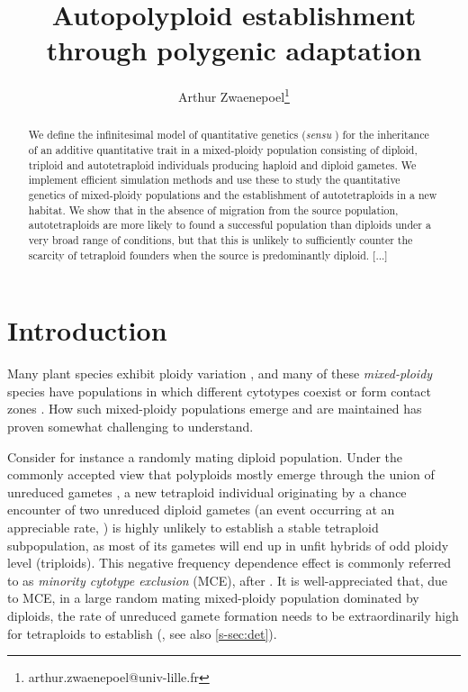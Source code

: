 \documentclass[11pt,a4paper]{article}
\begin{document}
\title{Autopolyploid establishment through polygenic adaptation}
\author[1]{Arthur Zwaenepoel\thanks{arthur.zwaenepoel@univ-lille.fr}}
\date{\vspace{-5ex}}
\maketitle
\begin{abstract}
We define the infinitesimal model of quantitative genetics (\textit{sensu}
\cite{barton2017}) for the inheritance of an additive quantitative trait in a
mixed-ploidy population consisting of diploid, triploid and autotetraploid
individuals producing haploid and diploid gametes.
We implement efficient simulation methods and use these to study the
quantitative genetics of mixed-ploidy populations and the establishment of
autotetraploids in a new habitat.
We show that in the absence of migration from the source population,
autotetraploids are more likely to found a successful population than diploids
under a very broad range of conditions, but that this is unlikely to
sufficiently counter the scarcity of tetraploid founders when the source is
predominantly diploid.
[...]
\end{abstract}

\section*{Introduction}

Many plant species exhibit ploidy variation
\citep{levin2002,soltis2007,rice2015}, and many of these \textit{mixed-ploidy}
species have populations in which different cytotypes coexist or form contact
zones \citep{kolar2017}.
How such mixed-ploidy populations emerge and are maintained has proven somewhat
challenging to understand.

Consider for instance a randomly mating diploid population.
Under the commonly accepted view that polyploids mostly emerge through the
union of unreduced gametes \citep{herben2016,kreiner2017b}, a new tetraploid
individual originating by a chance encounter of two unreduced diploid gametes
(an event occurring at an appreciable rate, \citep{kreiner2017}) is highly
unlikely to establish a stable tetraploid subpopulation, as most of its gametes
will end up in unfit hybrids of odd ploidy level (triploids).
This negative frequency dependence effect is commonly referred to as
\textit{minority cytotype exclusion} (MCE), after \cite{levin1975}.
It is well-appreciated that, due to MCE, in a large random mating mixed-ploidy
population dominated by diploids, the rate of unreduced gamete formation needs
to be extraordinarily high for tetraploids to establish (\cite{felber1997}, see
also \cref{s-sec:det}).
\end{document}
